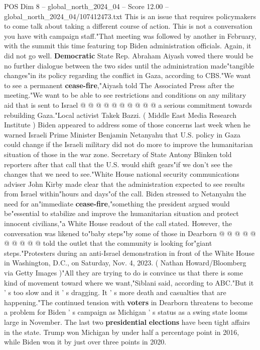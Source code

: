 \begin{textsample}{POS Dim 8 – global\_north\_2024\_04 – Score 12.00 – global\_north\_2024\_04/107412473.txt}
This is an issue that requires policymakers to come talk about taking a different course of action.
This is not a conversation you have with campaign staff."That meeting was followed by another in February, with the summit this time featuring top Biden administration officials.
Again, it did not go well. \textbf{Democratic} State Rep.
Abraham Aiyash vowed there would be no further dialogue between the two sides until the administration made"tangible changes"in its policy regarding the conflict in Gaza, according to CBS."We want to see a permanent \textbf{cease-fire},"Aiyash told The Associated Press after the meeting."We want to be able to see restrictions and conditions on any military aid that is sent to Israel @ @ @ @ @ @ @ @ @ @ a serious commitment towards rebuilding Gaza."Local activist Takek Bazzi. ( Middle East Media Research Institute ) Biden appeared to address some of those concerns last week when he warned Israeli Prime Minister Benjamin Netanyahu that U.S. policy in Gaza could change if the Israeli military did not do more to improve the humanitarian situation of those in the war zone.
Secretary of State Antony Blinken told reporters after that call that the U.S. would shift gears"if we don't see the changes that we need to see."White House national security communications adviser John Kirby made clear that the administration expected to see results from Israel within"hours and days"of the call.
Biden stressed to Netanyahu the need for an"immediate \textbf{cease-fire},"something the president argued would be"essential to stabilize and improve the humanitarian situation and protect innocent civilians,"a White House readout of the call stated.
However, the conversation was likened to"baby steps"by some of those in Dearborn @ @ @ @ @ @ @ @ @ @ told the outlet that the community is looking for"giant steps."Protesters during an anti-Israel demonstration in front of the White House in Washington, D.C., on Saturday, Nov. 4, 2023. ( Nathan Howard/Bloomberg via Getty Images )"All they are trying to do is convince us that there is some kind of movement toward where we want,"Siblani said, according to ABC."But it ' s too slow and it ' s dragging.
It ' s more death and casualties that are happening."The continued tension with \textbf{voters} in Dearborn threatens to become a problem for Biden ' s campaign as Michigan ' s status as a swing state looms large in November.
The last two \textbf{presidential} \textbf{elections} have been tight affairs in the state.
Trump won Michigan by under half a percentage point in 2016, while Biden won it by just over three points in 2020.

\end{textsample}
